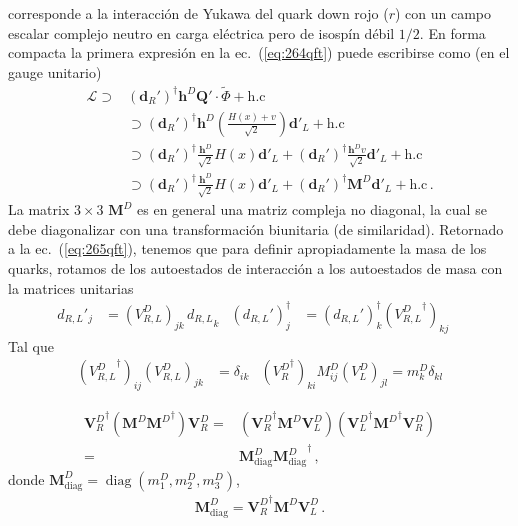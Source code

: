 \begin{frame}
corresponde a la interacción de Yukawa del quark down rojo ($r$) con un campo escalar complejo neutro en carga eléctrica pero de isospín débil $1/2$. En forma compacta la primera expresión en la ec.~(\ref{eq:264qft}) puede escribirse como (en el gauge unitario)
\begin{align}
  \mathcal{L}\supset&(\mathbf{d}_R')^{\dagger} \mathbf{h}^D\mathbf{Q}'\cdot \widetilde{\Phi} +\text{h.c}\nonumber\\
  &\supset(\mathbf{d}_R')^{\dagger} \mathbf{h}^D
  \left(\frac{H(x)+v}{\sqrt{2}}\right)\mathbf{d}'_L
  +\text{h.c}\nonumber\\
  &\supset(\mathbf{d}_R')^{\dagger}  \frac{\mathbf{h}^D}{\sqrt{2}}H(x)\mathbf{d}'_L
  +(\mathbf{d}_R')^{\dagger}  \frac{\mathbf{h}^Dv}{\sqrt{2}}\mathbf{d}'_L
      +\text{h.c}\nonumber\\
  &\supset(\mathbf{d}_R')^{\dagger}  \frac{\mathbf{h}^D}{\sqrt{2}}H(x)\mathbf{d}'_L
  +(\mathbf{d}_R')^{\dagger}  \mathbf{M}^D\mathbf{d}'_L
      +\text{h.c}\,.
\end{align}
La matrix $3\times 3$ $\mathbf{M}^D$ es en general una matriz compleja no diagonal, la cual se debe diagonalizar con una transformación biunitaria (de similaridad).
Retornado a la ec.~(\ref{eq:265qft}), tenemos que para definir apropiadamente la masa de los quarks, rotamos de los autoestados de interacción a los autoestados de masa con la matrices unitarias
\begin{align}
  \label{eq:229qft}
  {d_{R,L}}'_j&=(V^D_{R,L})_{jk}\, {d_{R,L}}_k&   (d_{R,L}')^{\dagger}_j&=(d_{R,L}')^{\dagger}_k({V^D_{R,L}}^\dagger)_{kj}\,&
\end{align}
Tal que
\begin{align}
  ({V^D_{R,L}}^\dagger)_{ij}(V^D_{R,L})_{jk}&=\delta_{ik}& ({V^D_R}^\dagger)_{ki}M^D_{ij}(V^D_L)_{jl}=m^D_k\delta_{kl}
\end{align}

\begin{align}
 {\mathbf{V}_R^D}^\dagger \left(\mathbf{M}^D{\mathbf{M}^D}^\dagger\right)\mathbf{V}_R^D=&
 \left({\mathbf{V}_R^D}^\dagger \mathbf{M}^D\mathbf{V}_L^D\right)\left({\mathbf{V}_L^D}^\dagger{\mathbf{M}^D}^\dagger\mathbf{V}_R^D\right)\nonumber\\
 =& \mathbf{M}^D_{\text{diag}}{\mathbf{M}^D_{\text{diag}}}^\dagger\,,
\end{align}
donde $\mathbf{M}^D_{\text{diag}}=\operatorname{diag}(m_1^D,m_2^D,m_3^D)$,
\begin{align}
  \mathbf{M}^D_{\text{diag}}={\mathbf{V}_R^D}^\dagger \mathbf{M}^D\mathbf{V}_L^D\,.
\end{align}


\end{frame}
